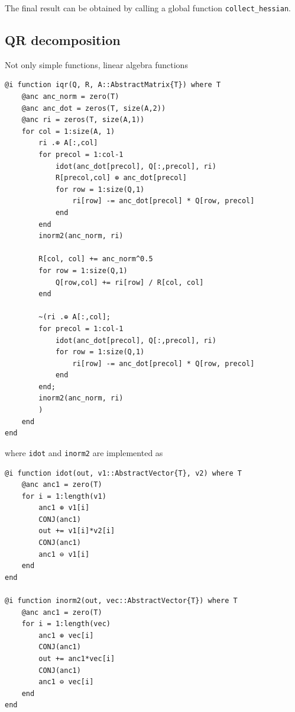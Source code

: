 \documentclass{article}
\newcommand{\<}{\langle}
\renewcommand{\>}{\rangle}
\begin{document}
The final result can be obtained by calling a global function \texttt{collect\_hessian}.

\subsection{QR decomposition}

Not only simple functions, linear algebra functions 

\begin{minipage}{.44\textwidth}
\begin{lstlisting}
@i function iqr(Q, R, A::AbstractMatrix{T}) where T
    @anc anc_norm = zero(T)
    @anc anc_dot = zeros(T, size(A,2))
    @anc ri = zeros(T, size(A,1))
    for col = 1:size(A, 1)
        ri .⊕ A[:,col]
        for precol = 1:col-1
            idot(anc_dot[precol], Q[:,precol], ri)
            R[precol,col] ⊕ anc_dot[precol]
            for row = 1:size(Q,1)
                ri[row] -= anc_dot[precol] * Q[row, precol]
            end
        end
        inorm2(anc_norm, ri)

        R[col, col] += anc_norm^0.5
        for row = 1:size(Q,1)
            Q[row,col] += ri[row] / R[col, col]
        end

        ~(ri .⊕ A[:,col];
        for precol = 1:col-1
            idot(anc_dot[precol], Q[:,precol], ri)
            for row = 1:size(Q,1)
                ri[row] -= anc_dot[precol] * Q[row, precol]
            end
        end;
        inorm2(anc_norm, ri)
        )
    end
end
\end{lstlisting}
\end{minipage}

where \texttt{idot} and \texttt{inorm2} are implemented as

\begin{minipage}{.44\textwidth}
\begin{lstlisting}
@i function idot(out, v1::AbstractVector{T}, v2) where T
    @anc anc1 = zero(T)
    for i = 1:length(v1)
        anc1 ⊕ v1[i]
        CONJ(anc1)
        out += v1[i]*v2[i]
        CONJ(anc1)
        anc1 ⊖ v1[i]
    end
end

@i function inorm2(out, vec::AbstractVector{T}) where T
    @anc anc1 = zero(T)
    for i = 1:length(vec)
        anc1 ⊕ vec[i]
        CONJ(anc1)
        out += anc1*vec[i]
        CONJ(anc1)
        anc1 ⊖ vec[i]
    end
end
\end{lstlisting}
\end{minipage}
\end{document}
